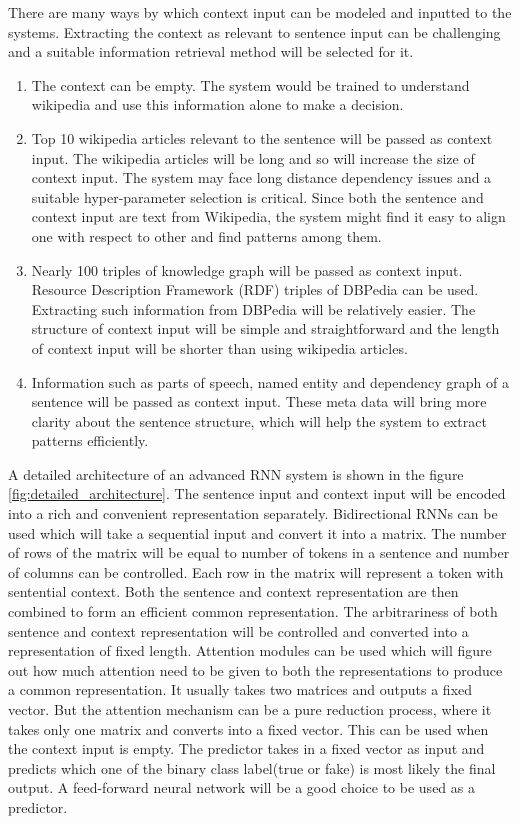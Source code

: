 \documentclass[a4paper, 11pt]{article}
\begin{document}
There are many ways by which context input can be modeled and inputted to the systems. \color{red}Extracting the context as relevant to sentence input can be challenging and a suitable information retrieval method will be selected for it.\color{black}

\begin{enumerate}
\item The context can be empty. The system would be trained to understand wikipedia and use this information alone to make a decision.
\item Top 10 wikipedia articles relevant to the sentence will be passed as context input. The wikipedia articles will be long and so will increase the size of context input. The system may face long distance dependency issues and a suitable hyper-parameter selection is critical. Since both the sentence and context input are text from Wikipedia, the system might find it easy to align one with respect to other and find patterns among them. 
\item Nearly 100 triples of knowledge graph will be passed as context input. Resource Description Framework (RDF) triples of DBPedia can be used. Extracting such information from DBPedia will be relatively easier. The structure of context input will be simple and straightforward and the length of context input will be shorter than using wikipedia articles.  
\item Information such as parts of speech, named entity and dependency graph of a sentence will be passed as context input. These meta data will bring more clarity about the sentence structure, which will help the system to extract patterns efficiently. 
\end{enumerate}

A detailed architecture of an advanced RNN system is shown in the figure \ref{fig:detailed_architecture}. The sentence input and context input will be encoded into a rich and convenient representation separately. Bidirectional RNNs can be used which will take a sequential input and convert it into a matrix. The number of rows of the matrix will be equal to number of tokens in a sentence and number of columns can be controlled. Each row in the matrix will represent a token with sentential context. Both the sentence and context representation are then combined to form an efficient common representation. The arbitrariness of both sentence and context representation will be controlled and converted into a representation of fixed length. Attention modules can be used which will figure out how much attention need to be given to both the representations to produce a common representation. It usually takes two matrices and outputs a fixed vector. But the attention mechanism can be a pure reduction process, where it takes only one matrix and converts into a fixed vector. This can be used when the context input is empty. The predictor takes in a fixed vector as input and predicts which one of the binary class label(true or fake) is most likely the final output. A feed-forward neural network will be a good choice to be used as a predictor. 
\end{document}
